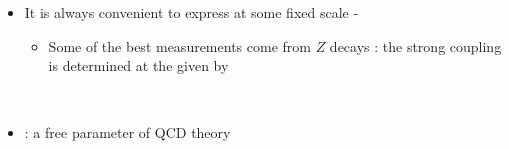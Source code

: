\begin{frame}
\begin{itemize}
\vspace{1mm}
\item {\scriptsize It is always convenient to express \alps at some fixed scale - \\}
\tri
\begin{itemize}
\item {\scriptsize Some of the best measurements come from $Z$ decays : the strong coupling is determined at the  given by \\}
\end{itemize}
\begin{center}
{\scriptsize{}\\}
\end{center}
\ball
\item {\scriptsize \alps: a free parameter of QCD theory \\}
\tri
{}
\ball
\end{itemize}
\hfill {\tiny {}\\}
\end{frame}

